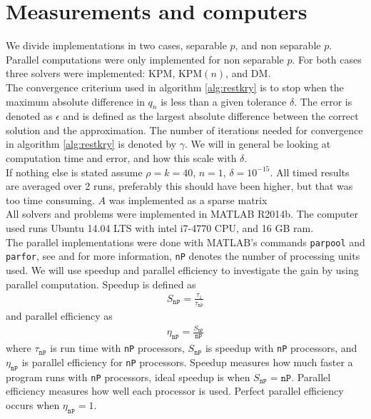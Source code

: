 \section{Measurements and computers} \label{sec:not}

We divide implementations in two cases, separable $p$, and non separable $p$. Parallel computations were only implemented for non separable $p$. For both cases three solvers were implemented: KPM, KPM$(n)$, and DM. \\

The convergence criterium used in algorithm \ref{alg:restkry} is to stop when the maximum absolute difference in $q_n$ is less than a given tolerance $\delta$. The error is denoted as $\epsilon$ and is defined as the largest absolute difference between the correct solution and the approximation. 
The number of iterations needed for convergence in algorithm \ref{alg:restkry} is denoted by $\gamma$. 
We will in general be looking at computation time and error, and how this scale with $\delta$. \\

If nothing else is stated assume $\rho = k = 40$, $n = 1$, $\delta = 10^{-15}$. All timed results are averaged over 2 runs, preferably this should have been higher, but that was too time consuming. $A$ was implemented as a sparse matrix\\


All solvers and problems were implemented in MATLAB R2014b. The computer used runs Ubuntu 14.04 LTS with intel  i7-4770 CPU, and 16 GB ram. \\

The parallel implementations were done with MATLAB's commands \texttt{parpool} and \texttt{parfor}, see \cite{parpool} and \cite{parfor} for more information, \texttt{nP} denotes the number of processing units used. We will use speedup and parallel efficiency to investigate the gain by using parallel computation. Speedup is defined as
\begin{align*}
S_\texttt{nP} = \frac{\tau_1}{\tau_\texttt{nP}}
\end{align*}
and parallel efficiency as
\begin{align*}
\eta_\texttt{nP} = \frac{S_\texttt{nP}}{\texttt{nP}}
\end{align*}
where $\tau_\texttt{nP}$ is run time with \texttt{nP} processors, $S_\texttt{nP}$ is speedup with \texttt{nP} processors, and $\eta_\texttt{nP}$ is parallel efficiency for \texttt{nP} processors. Speedup measures how much faster a program runs with \texttt{nP} processors, ideal speedup is when $S_\texttt{nP} = \texttt{nP}$. Parallel efficiency measures how well each processor is used. Perfect parallel efficiency occurs when $\eta_\texttt{nP} = 1$.
